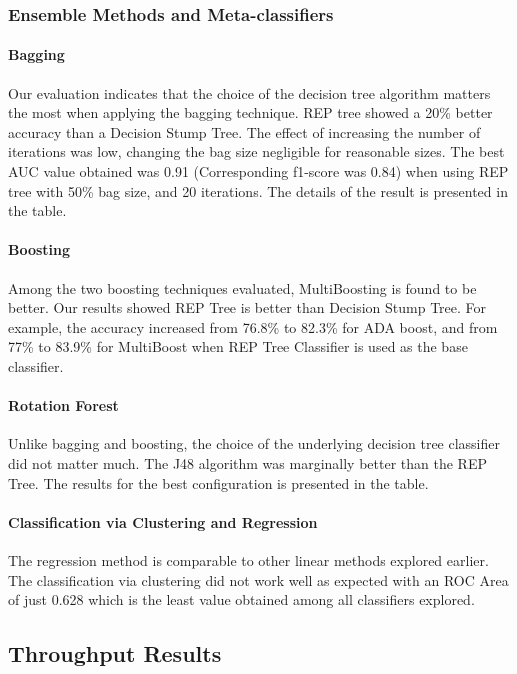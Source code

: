 \subsubsection{Ensemble Methods and Meta-classifiers}

\paragraph{Bagging}

Our evaluation indicates that the choice of the decision tree algorithm matters the most when applying the bagging technique. REP tree showed a 20\% better accuracy than a Decision Stump Tree. The effect of increasing the number of iterations was low, changing the bag size negligible for reasonable sizes. The best AUC value obtained was 0.91 (Corresponding f1-score was 0.84) when using REP tree with 50\% bag size, and 20 iterations. The details of the result is presented in the table.

\paragraph{Boosting}

Among the two boosting techniques evaluated, MultiBoosting is found to be better. Our results showed REP Tree is better than Decision Stump Tree. For example, the accuracy increased from 76.8\% to 82.3\% for ADA boost, and from 77\% to 83.9\% for MultiBoost when REP Tree Classifier is used as the base classifier.

\paragraph{Rotation Forest}

Unlike bagging and boosting, the choice of the underlying decision tree classifier did not matter much. The J48 algorithm was marginally better than the REP Tree. The results for the best configuration is presented in the table.

\paragraph{Classification via Clustering and Regression}
The regression method is comparable to other linear methods explored earlier. The classification via clustering did not work well as expected with an ROC Area of just 0.628 which is the least value obtained among all classifiers explored.


\subsection{Throughput Results}

